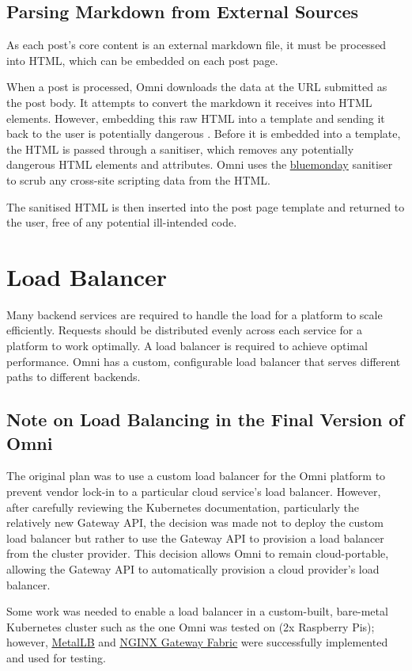 \subsection{Parsing Markdown from External Sources}
As each post's core content is an external markdown file, it must be processed into HTML, which can be embedded on each post page.  

When a post is processed, Omni downloads the data at the URL submitted as the post body. It attempts to convert the markdown it receives into HTML elements.
However, embedding this raw HTML into a template and sending it back to the user is potentially dangerous \citep{singh2020analytical}.
Before it is embedded into a template, the HTML is passed through a sanitiser, which removes any potentially dangerous HTML elements and attributes. 
Omni uses the \underline{\href{https://github.com/microcosm-cc/bluemonday}{bluemonday}} \nocite{bluemonday} sanitiser to scrub any cross-site scripting data from the HTML.

The sanitised HTML is then inserted into the post page template and returned to the user, free of any potential ill-intended code.

\section{Load Balancer}
Many backend services are required to handle the load for a platform to scale efficiently.
Requests should be distributed evenly across each service for a platform to work optimally. A load balancer is required to achieve optimal performance.
Omni has a custom, configurable load balancer that serves different paths to different backends.

\subsection{Note on Load Balancing in the Final Version of Omni}
The original plan was to use a custom load balancer for the Omni platform to prevent vendor lock-in to a particular cloud service's load balancer.
However, after carefully reviewing the Kubernetes documentation, particularly the relatively new Gateway API, the decision was made not to deploy the custom load balancer but rather to use the Gateway API to provision a load balancer from the cluster provider.
This decision allows Omni to remain cloud-portable, allowing the Gateway API to automatically provision a cloud provider's load balancer. 

Some work was needed to enable a load balancer in a custom-built, bare-metal Kubernetes cluster such as the one Omni was tested on (2x Raspberry Pis); however, \underline{\href{https://metallb.io}{MetalLB}} \nocite{metallb} and \underline{\href{https://docs.nginx.com/nginx-gateway-fabric/}{NGINX Gateway Fabric}} \nocite{nginxgatewayfabric} were successfully implemented and used for testing.

